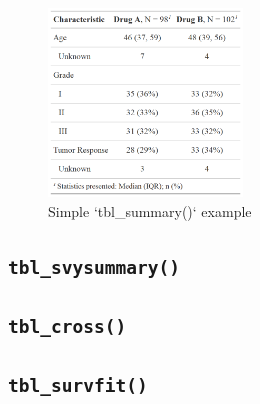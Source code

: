 \documentclass[
]{article}
\newenvironment{Shaded}{\begin{snugshade}}{\end{snugshade}}
\newcommand{\DataTypeTok}[1]{\textcolor[rgb]{0.13,0.29,0.53}{#1}}
\newcommand{\DecValTok}[1]{\textcolor[rgb]{0.00,0.00,0.81}{#1}}
\newcommand{\KeywordTok}[1]{\textcolor[rgb]{0.13,0.29,0.53}{\textbf{#1}}}
\newcommand{\NormalTok}[1]{#1}
\newcommand{\OperatorTok}[1]{\textcolor[rgb]{0.81,0.36,0.00}{\textbf{#1}}}
\newcommand{\StringTok}[1]{\textcolor[rgb]{0.31,0.60,0.02}{#1}}
\begin{document}
\begin{Shaded}
\end{Shaded}

\begin{figure}[h!]
  \caption{Simple `tbl\_summary()` example}
  \label{fig:summary_basic}
  \includegraphics[height=5cm]{summary_basic.png}
  \centering
\end{figure}

\hypertarget{tbl_svysummary}{%
\subsection{\texorpdfstring{\texttt{tbl\_svysummary()}}{tbl\_svysummary()}}\label{tbl_svysummary}}

\hypertarget{tbl_cross}{%
\subsection{\texorpdfstring{\texttt{tbl\_cross()}}{tbl\_cross()}}\label{tbl_cross}}

\hypertarget{tbl_survfit}{%
\subsection{\texorpdfstring{\texttt{tbl\_survfit()}}{tbl\_survfit()}}\label{tbl_survfit}}
\end{document}
